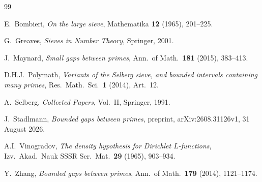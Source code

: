 \documentclass[11pt,a4paper]{article}
\theoremstyle{plain}
\theoremstyle{definition}
\theoremstyle{plain}
\numberwithin{equation}{section}
\begin{document}
\begin{thebibliography}{99}

E.~Bombieri,
\textit{On the large sieve},
Mathematika \textbf{12} (1965), 201--225.

G.~Greaves,
\textit{Sieves in Number Theory},
Springer, 2001.

J.~Maynard,
\textit{Small gaps between primes},
Ann.\ of Math.\ \textbf{181} (2015), 383--413.

D.H.J.~Polymath,
\textit{Variants of the Selberg sieve, and bounded intervals containing many primes},
Res.\ Math.\ Sci.\ \textbf{1} (2014), Art.~12.

A.~Selberg,
\textit{Collected Papers}, Vol.~II,
Springer, 1991.

J.~Stadlmann,
\textit{Bounded gaps between primes},
preprint, arXiv:2608.31126v1, 31 August 2026.

A.I.~Vinogradov,
\textit{The density hypothesis for Dirichlet \(L\)-functions},
Izv.\ Akad.\ Nauk SSSR Ser.\ Mat.\ \textbf{29} (1965), 903--934.

Y.~Zhang,
\textit{Bounded gaps between primes},
Ann.\ of Math.\ \textbf{179} (2014), 1121--1174.

\end{thebibliography}
\end{document}
